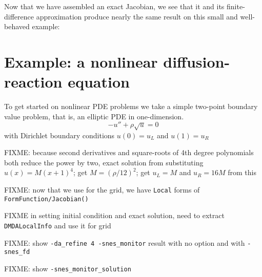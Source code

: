 Now that we have assembled an exact Jacobian, we see that it and its finite-difference approximation produce nearly the same result on this small and well-behaved example:


\section{Example: a nonlinear diffusion-reaction equation}

To get started on nonlinear PDE problems we take a simple two-point boundary value problem, that is, an elliptic PDE in one-dimension.  
\begin{equation}
-u'' + \rho \sqrt{u} = 0 \label{eq:nl:diffusionreaction}
\end{equation}
with Dirichlet boundary conditions $u(0)=u_L$ and $u(1)=u_R$


FIXME: because second derivatives and square-roots of 4th degree polynomials both reduce the power by two, exact solution from substituting $u(x)=M(x+1)^4$; get $M=(\rho/12)^2$; get $u_L=M$ and $u_R=16 M$ from this

FIXME: now that we use \pDMDA for the grid, we have \texttt{Local} forms of \texttt{FormFunction/Jacobian()}

FIXME in setting initial condition and exact solution, need to extract \texttt{DMDALocalInfo} and use it for grid

FIXME: show \texttt{-da\_refine 4 -snes\_monitor} result with no option and with \texttt{-snes\_fd}

FIXME: show \texttt{-snes\_monitor\_solution}

